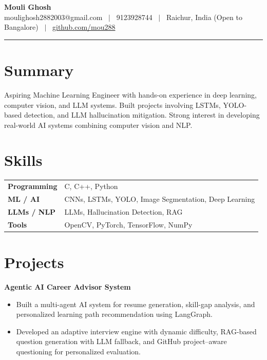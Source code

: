 \documentclass[10pt, a4paper]{article}
\begin{document}
{\LARGE\bfseries Mouli Ghosh}\\[3pt]
{\small moulighosh2882003@gmail.com \ $|$ \ 9123928744 \ $|$ \ Raichur, India (Open to Bangalore) \ $|$ \ \href{https://github.com/mou288}{github.com/mou288}}

\vspace{4pt}
\hrule
\vspace{6pt}

\section*{Summary}
Aspiring Machine Learning Engineer with hands-on experience in deep learning, computer vision, and LLM systems. Built projects involving LSTMs, YOLO-based detection, and LLM hallucination mitigation. Strong interest in developing real-world AI systems combining computer vision and NLP.

\section*{Skills}
\begin{tabularx}{\linewidth}{@{} l X @{}}
\textbf{Programming} & C, C++, Python \\
\textbf{ML / AI} & CNNs, LSTMs, YOLO, Image Segmentation, Deep Learning \\
\textbf{LLMs / NLP} & LLMs, Hallucination Detection, RAG \\
\textbf{Tools} & OpenCV, PyTorch, TensorFlow, NumPy \\
\end{tabularx}

\vspace{6pt}

\section*{Projects}

\textbf{Agentic AI Career Advisor System}
\begin{itemize}[leftmargin=*]
\item Built a multi-agent AI system for resume generation, skill-gap analysis, and personalized learning path recommendation using LangGraph.
\item Developed an adaptive interview engine with dynamic difficulty, RAG-based question generation with LLM fallback, and GitHub project–aware questioning for personalized evaluation.
\end{itemize}
\end{document}
